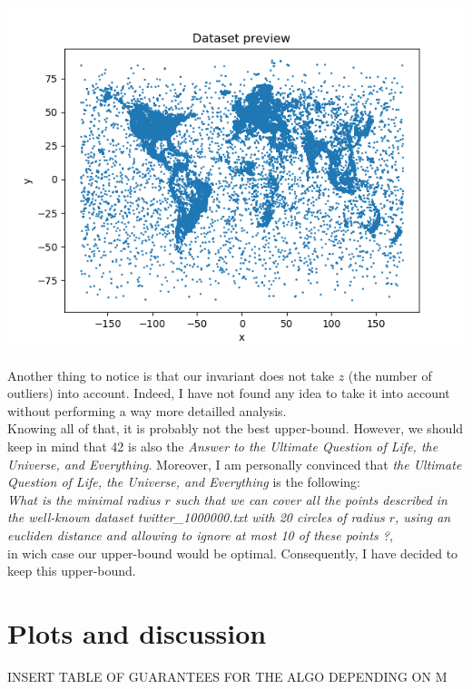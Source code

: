 \documentclass[a4paper]{article}%
\begin{document}
	\includegraphics{dataset_preview}

	Another thing to notice is that our invariant does not take $z$ (the number of outliers) into account.
	Indeed, I have not found any idea to take it into account without performing a way more detailled analysis.\\

	Knowing all of that, it is probably not the best upper-bound.
	However, we should keep in mind that 42 is also the \textit{Answer to the Ultimate Question of Life, the Universe, and Everything}.
	Moreover, I am personally convinced that \textit{the Ultimate Question of Life, the Universe, and Everything} is the following:\\
	\textit{What is the minimal radius $r$ such that we can cover all the points described in the well-known dataset twitter\_1000000.txt with
	20 circles of radius $r$, using an eucliden distance and allowing to ignore at most 10 of these points ?},\\
	in wich case our upper-bound would be optimal.
	Consequently, I have decided to keep this upper-bound.

	\section{Plots and discussion}

	INSERT TABLE OF GUARANTEES FOR THE ALGO DEPENDING ON M
\end{document}
